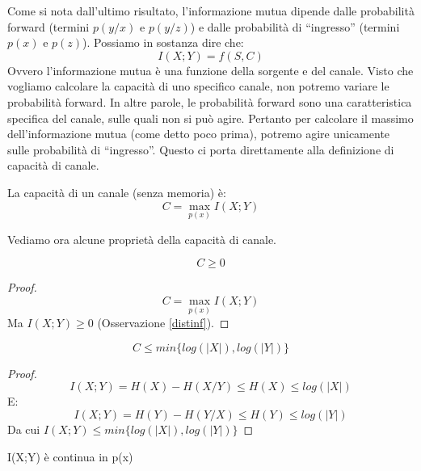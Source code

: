 Come si nota dall'ultimo risultato, l'informazione mutua dipende dalle probabilità forward (termini $p(y/x)$ e $p(y/z)$) e dalle probabilità di ``ingresso'' (termini $p(x)$ e $p(z)$).
Possiamo in sostanza dire che:
\[
 I(X;Y)=f(S,C)
\]
Ovvero l'informazione mutua è una funzione della sorgente e del canale. Visto che vogliamo calcolare la capacità di uno specifico canale, non potremo variare le probabilità forward. In altre parole, le probabilità forward sono una caratteristica specifica del canale, sulle quali non si può agire. Pertanto per calcolare il massimo dell'informazione mutua (come detto poco prima), potremo agire 
unicamente sulle probabilità di ``ingresso''. Questo ci porta direttamente alla definizione di capacità di canale.

\begin{definizione}
 La capacità di un canale (senza memoria) è:
 \[
  C=\max_{p(x)} I(X;Y)
 \]

\end{definizione}

\bigskip

\noindent
Vediamo ora alcune proprietà della capacità di canale.

\begin{osservazione}
\[
 C \ge 0
\]
 \begin{proof}
  \[
   C=\max_{p(x)} I(X;Y)
  \]
  Ma $I(X;Y) \ge 0$ (Osservazione \ref{distinf}).
 \end{proof}
\end{osservazione}

\bigskip

\begin{osservazione}
\[
 C \le min\{log(|X|), log(|Y|)\}
\]
 \begin{proof}
  \[
   I(X;Y)=H(X)-H(X/Y) \le H(X) \le log(|X|)
  \]
  E:
  \[
   I(X;Y)=H(Y)-H(Y/X) \le H(Y) \le log(|Y|)
  \]
  Da cui $I(X;Y) \le min\{log(|X|), log(|Y|)\}$
 \end{proof}
\end{osservazione}

\bigskip

\begin{osservazione}
\mbox{}

 I(X;Y) è continua in p(x)
\end{osservazione}

